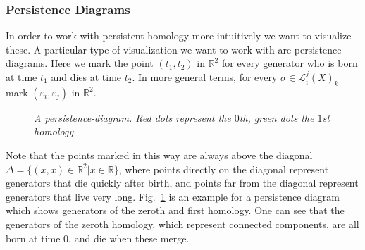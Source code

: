 \documentclass[11pt, a4paper, UKenglish]{article}
\newcommand{\bR}{\mathbb{R}}
\begin{document}
    \subsubsection{Persistence Diagrams}\label{subsec:persistence-diagrams}
    In order to work with persistent homology more intuitively we want to visualize these.
    A particular type of visualization we want to work with are persistence diagrams.
    Here we mark the point $(t_1,t_2)$ in $\bR^2$ for every generator who is born at time $t_1$ and dies at time $t_2$.
    In more general terms, for every $\sigma\in\mathcal{L}_i^j(X)_k$ mark $(\varepsilon_i,\varepsilon_j)$ in $\bR^2$.
    \begin{figure}
        \centering
        \caption{\textit{A persistence-diagram.
        Red dots represent the $0$th, green dots the $1$st homology}}
        \label{fig2}
    \end{figure}

	Note that the points marked in this way are always above the diagonal $\Delta=\{(x,x)\in\bR^2|x\in\bR\}$, where points directly on the diagonal represent generators that die quickly after birth, and points far from the diagonal represent generators that live very long.
    Fig.~\ref{fig2} is an example for a persistence diagram which shows generators of the zeroth and first homology.
    One can see that the generators of the zeroth homology, which represent connected components, are all born at time $0$, and die when these merge.\\
\end{document}
